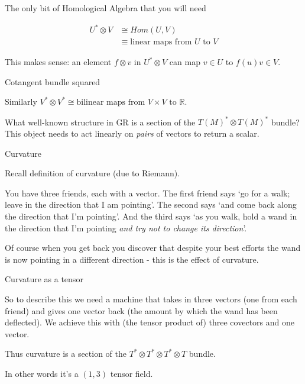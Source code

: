 \documentclass{beamer}
\begin{document}
\begin{frame}{The only bit of Homological Algebra that you will need}

\begin{equation*}
\begin{split}
U^* \otimes V & \cong Hom(U, V) \\
& \equiv \text{linear maps from $U$ to $V$}
\end{split}
\end{equation*}

This makes sense: an element $f \otimes v$ in $U^* \otimes V$ can map $v \in U$ to $f(u) v \in V$.

\end{frame}

\begin{frame}{Cotangent bundle squared}

Similarly $V^* \otimes V^* \cong \text{bilinear maps from } V \times V \text{ to } \mathbb{R}$.

What well-known structure in GR is a section of the $T(M)^* \otimes T(M)^*$ bundle? This object needs to act linearly on \textit{pairs} of vectors to return a scalar.

\end{frame}

\begin{frame}{Curvature}

Recall definition of curvature (due to Riemann).

You have three friends, each with a vector. The first friend says `go for a walk; leave in the direction that I am pointing'. The second says `and come back along the direction that I'm pointing'. And the third says `as you walk, hold a wand in the direction that I'm pointing \textit{and try not to change its direction}'.

Of course when you get back you discover that despite your best efforts the wand is now pointing in a different direction - this is the effect of curvature.

\end{frame}

\begin{frame}{Curvature as a tensor}

So to describe this we need a machine that takes in three vectors (one from each friend) and gives one vector back (the amount by which the wand has been deflected). We achieve this with (the tensor product of) three covectors and one vector.

Thus curvature is a section of the $T^* \otimes T^* \otimes T^* \otimes T$ bundle.

 In other words it's a $(1,3)$ tensor field.

\end{frame}
\end{document}

